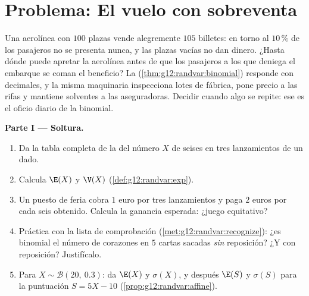 \section{Problema: El vuelo con sobreventa}

\begin{problem}
\label{pb:g12:randvar:1}
Una aerolínea con $100$ plazas vende alegremente $105$ billetes: en torno
al $10\,\%$ de los pasajeros no se presenta nunca, y las plazas vacías no
dan dinero. ¿Hasta dónde puede apretar la aerolínea antes de que los
pasajeros a los que deniega el embarque se coman el beneficio? La
 (\cref{thm:g12:randvar:binomial}) responde con
decimales, y la misma maquinaria inspecciona lotes de fábrica, pone precio
a las rifas y mantiene solventes a las aseguradoras. Decidir cuando algo se
repite: ese es el oficio diario de la binomial.

\medskip
\noindent\textbf{Parte I --- Soltura.}
\begin{enumerate}
  \item Da la tabla completa de la  del número $X$ de seises en
        tres lanzamientos de un dado.
  \item Calcula $\E(X)$ y $\V(X)$ (\cref{def:g12:randvar:exp}).
  \item Un puesto de feria cobra $1$ euro por tres lanzamientos y paga $2$
        euros por cada seis obtenido. Calcula la ganancia esperada: ¿juego
        equitativo?
  \item Práctica con la lista de comprobación
        (\cref{met:g12:randvar:recognize}): ¿es binomial el número de
        corazones en $5$ cartas sacadas \emph{sin} reposición? ¿Y con
        reposición? Justifícalo.
  \item Para $X \sim \mathcal B(20,\ 0.3)$: da $\E(X)$ y $\sigma(X)$, y
        después $\E(S)$ y $\sigma(S)$ para la puntuación $S = 5X - 10$
        (\cref{prop:g12:randvar:affine}).
\end{enumerate}


\end{problem}
